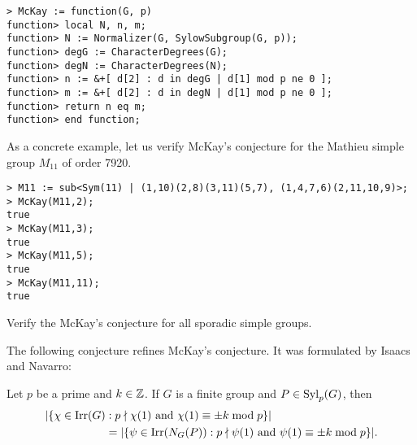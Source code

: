 \begin{lstlisting}
> McKay := function(G, p)
function> local N, n, m;
function> N := Normalizer(G, SylowSubgroup(G, p));
function> degG := CharacterDegrees(G);
function> degN := CharacterDegrees(N);
function> n := &+[ d[2] : d in degG | d[1] mod p ne 0 ];
function> m := &+[ d[2] : d in degN | d[1] mod p ne 0 ];
function> return n eq m;
function> end function;
\end{lstlisting}

As a concrete example, let us 
verify McKay's conjecture for the Mathieu simple group 
$M_{11}$ of order 7920. 

\begin{lstlisting}
> M11 := sub<Sym(11) | (1,10)(2,8)(3,11)(5,7), (1,4,7,6)(2,11,10,9)>;
> McKay(M11,2);
true
> McKay(M11,3);
true
> McKay(M11,5);
true
> McKay(M11,11);
true
\end{lstlisting}






\begin{bonus}
    Verify the McKay's conjecture for 
    all sporadic simple groups. 
\end{bonus}

The following conjecture refines McKay's conjecture. It was
formulated by Isaacs and Navarro:

\begin{conjecture}
\label{conjecture:IsaacsNavarro}
Let $p$ be a prime and $k\in\mathbb{Z}$. 
If $G$ is a finite group and $P\in\mathrm{Syl}_p(G)$,
then
\begin{align*}
|\{\chi\in\operatorname{Irr}(G)&:p\nmid \chi(1)\text{ and }\chi(1)\equiv\pm k\bmod p\}|\\
&=|\{\psi\in\operatorname{Irr}(N_G(P)):p\nmid\psi(1)\text{ and }\psi(1)\equiv\pm k\bmod p\}|.
\end{align*}
\end{conjecture}

